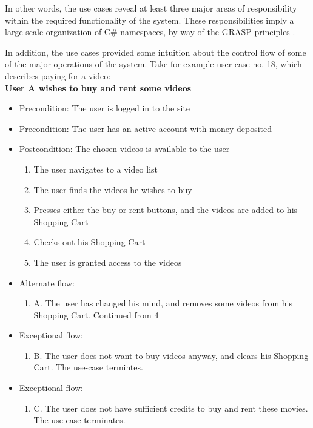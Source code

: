 In other words, the use cases reveal at least three major areas of responsibility within the required functionality of the system. These responsibilities imply a large scale organization of C\# namespaces, by way of the GRASP principles \cite[chapter.~17]{OOAD}.

In addition, the use cases provided some intuition about the control flow of some of the major operations of the system. Take for example user case no. 18, which describes paying for a video:\\

\textbf{User A wishes to buy and rent some videos}
\begin{itemize}
\item Precondition: The user is logged in to the site
\item Precondition: The user has an active account with money deposited
\item Postcondition: The chosen videos is available to the user
\begin{enumerate}
	\item The user navigates to a video list
	\item The user finds the videos he wishes to buy
    \item Presses either the buy or rent buttons, and the videos are added to his Shopping Cart
    \item Checks out his Shopping Cart
    \item The user is granted access to the videos
\end{enumerate}
	
\item Alternate flow:
\begin{enumerate}
	 \item A. The user has changed his mind, and removes some videos from his Shopping Cart. Continued from 4
\end{enumerate}
   
\item Exceptional flow:
\begin{enumerate}
 \item B. The user does not want to buy videos anyway, and clears his Shopping Cart. The use-case termintes.
\end{enumerate}
   
\item Exceptional flow:
\begin{enumerate}
	\item C. The user does not have sufficient credits to buy and rent these movies. The use-case terminates.
\end{enumerate}
    
\end{itemize}

